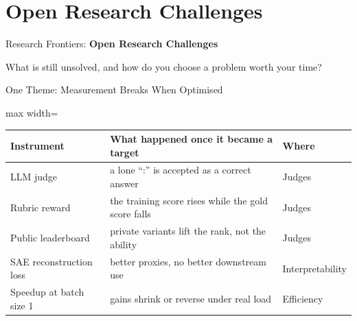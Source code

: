 \section{Open Research Challenges}

\begin{frame}{}
    \LARGE Research Frontiers: \textbf{Open Research Challenges}

    \vspace{1em}
    \normalsize What is still unsolved, and how do you choose a problem worth your time?
\end{frame}

\begin{frame}{One Theme: Measurement Breaks When Optimised}
    \begin{center}
    \small
    \renewcommand{\arraystretch}{1.08}
    \setlength{\tabcolsep}{4pt}\begin{adjustbox}{max width=\linewidth}\begin{tabular}{lll}
        \toprule
        \textbf{Instrument} & \textbf{What happened once it became a target} & \textbf{Where} \\
        \midrule
        LLM judge & a lone ``:'' is accepted as a correct answer & Judges \\
        Rubric reward & the training score rises while the gold score falls & Judges \\
        Public leaderboard & private variants lift the rank, not the ability & Judges \\
        SAE reconstruction loss & better proxies, no better downstream use & Interpretability \\
        Speedup at batch size 1 & gains shrink or reverse under real load & Efficiency \\
        \bottomrule
    \end{tabular}\end{adjustbox}
    \end{center}
\end{frame}

